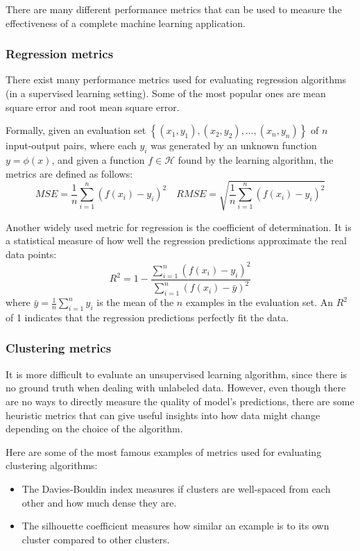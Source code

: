             There are many different performance metrics that can be used to measure the effectiveness of a complete machine learning application.
            \subsubsection{Regression metrics}
                There exist many performance metrics used for evaluating regression algorithms (in a supervised learning setting). Some of the most popular ones are mean square error and root mean square error.
                
                Formally, given an evaluation set \(\left\{\left(x_{1},y_{1}\right), \left(x_{2},y_{2}\right), \dots, \left(x_{n},y_{n}\right)\right\}\) of \(n\) input-output pairs, where each \(y_{i}\) was generated by an unknown function \(y=\phi\left(x\right)\), and given a function \(f \in \mathcal{H}\) found by the learning algorithm, the metrics are defined as follows:
                \[MSE = \frac{1}{n}\sum_{i=1}^{n}\left(f\left(x_{i}\right) - y_{i}\right)^{2} \quad RMSE = \sqrt{\frac{1}{n}\sum_{i=1}^{n}\left(f\left(x_{i}\right) - y_{i}\right)^{2}}\]
                
                Another widely used metric for regression is the coefficient of determination. It is a statistical measure of how well the regression predictions approximate the real data points:
                \[R^{2} = 1 - \frac{\sum_{i=1}^{n}\left(f\left(x_{i}\right) - y_{i}\right)^{2}}{\sum_{i=1}^{n}\left(f\left(x_{i}\right) - \bar{y}\right)^{2}}\]
                where \(\bar{y} = \frac{1}{n}\sum_{i=1}^{n}y_{i}\) is the mean of the \(n\) examples in the evaluation set. An \(R^{2}\) of 1 indicates that the regression predictions perfectly fit the data.
            \subsubsection{Clustering metrics}
                It is more difficult to evaluate an unsupervised learning algorithm, since there is no ground truth when dealing with unlabeled data. However, even though there are no ways to directly measure the quality of model's predictions, there are some heuristic metrics that can give useful insights into how data might change depending on the choice of the algorithm.
                
                Here are some of the most famous examples of metrics used for evaluating clustering algorithms:
                \begin{itemize}
                    \item The Davies-Bouldin index measures if clusters are well-spaced from each other and how much dense they are.
                    \item The silhouette coefficient measures how similar an example is to its own cluster compared to other clusters.
                \end{itemize}
